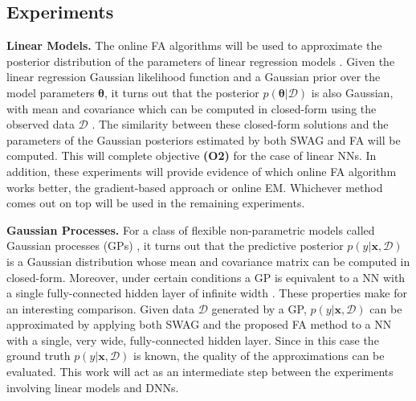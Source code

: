 \documentclass[a4paper,11pt]{article}
\newcommand{\matr}[1]{\mathbf{#1}}
\newcommand{\bgreek}[1]{\boldsymbol{#1}}
\begin{document}
\subsection{Experiments}\label{sec:experiments}

\textbf{Linear Models. } The online FA algorithms will be used to approximate the posterior distribution of the parameters of linear regression models \cite{murphy2012}. Given the linear regression Gaussian likelihood function and a Gaussian prior over the model parameters $\bgreek{\theta}$, it turns out that the posterior $p(\bgreek{\theta} | \mathcal{D})$ is also Gaussian, with mean and covariance which can be computed in closed-form using the observed data $\mathcal{D}$ \cite{murphy2012}. The similarity between these closed-form solutions and the parameters of the Gaussian posteriors estimated by both SWAG and FA will be computed. This will complete objective \textbf{(O2)} for the case of linear NNs. In addition, these experiments will provide evidence of which online FA algorithm works better, the gradient-based approach or online EM. Whichever method comes out on top will be used in the remaining experiments. 



\textbf{Gaussian Processes. } 
For a class of flexible non-parametric models called Gaussian processes (GPs) \cite{rasmussen2006}, it turns out that the predictive posterior $p(y | \matr{x}, \mathcal{D})$ is a Gaussian distribution whose mean and covariance matrix can be computed in closed-form. Moreover, under certain conditions a GP is equivalent to a NN with a single fully-connected hidden layer of infinite width \cite{williams1997}. These properties make for an interesting comparison. Given data $\mathcal{D}$ generated by a GP, $p(y | \matr{x}, \mathcal{D})$ can be approximated by applying both SWAG and the proposed FA method to a NN with a single, very wide, fully-connected hidden layer. Since in this case the ground truth $p(y | \matr{x}, \mathcal{D})$ is known, the quality of the approximations can be evaluated. This work will act as an intermediate step between the experiments involving linear models and DNNs. 
\end{document}
